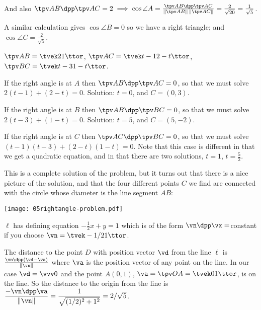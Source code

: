 And also $\tpv AB\dpp \tpv AC = 2 \implies \cos \angle A =
\frac{\tpv AB\dpp \tpv AC}{\|\tpv AB\|\,\|\tpv AC\|} =
\frac{2}{\sqrt{20}} = \frac{1}{\sqrt{5}}$.

A similar calculation gives $\cos \angle B = 0$ so we have a right triangle;
and $\cos\angle C = \frac{2}{\sqrt{5}}$.
\bigskip

\item[{\bfseries(VI12.4)}]

$\tpv AB = \tvek2\\1\ttor$,
$\tpv AC = \tvek t-1\\ 2-t\ttor$,
$\tpv BC = \tvek t-3 \\1-t\ttor$.

If the right angle is at $A$ then $\tpv AB \dpp \tpv AC = 0$, so that
we must solve $2(t-1) + (2-t) = 0$. Solution: $t=0$, and $C = (0,3)$.

If the right angle is at $B$ then $\tpv AB \dpp \tpv BC = 0$, so that
we must solve $2(t-3) + (1-t) = 0$. Solution: $t=5$, and $C = (5, -2)$.

If the right angle is at $C$ then $\tpv AC \dpp \tpv BC = 0$, so that
we must solve $(t-1)(t-3) + (2-t)(1-t) = 0$. Note that this case is
different in that we get a quadratic equation, and in that there are two
solutions, $t=1$, $t=\frac52$.

This is a complete solution of the problem, but it turns out that there is a
nice picture of the solution, and that the four different points $C$ we find
are connected with the circle whose diameter is the line segment $AB$:
\begin{center}
  \texttt{[image: 05rightangle-problem.pdf]}
\end{center}
\bigskip

\item[{\bfseries(VI12.5a)}]

$\ell$ has defining equation $-\frac12 x + y = 1$ which is of the form
$\vn\dpp\vx = $constant if you choose $\vn = \tvek-1/2 \\ 1\ttor$.
\bigskip

\item[{\bfseries(VI12.5b)}]

The distance to the point $D$ with position vector $\vd$ from the line
$\ell$ is $\frac{\vn\dpp(\vd-\va)}{\|\vn\|}$ where $\va$ is the position
vector of any point on the line.  In our case $\vd = \vvv0$
and the point $A(0,1)$, $\va = \tpv OA = \tvek 0\\1\ttor$, is on the line.
So the distance to the origin from the line is $\dfrac{-\vn\dpp\va}{\|\vn\|}
= \dfrac{1}{\sqrt{(1/2)^2 + 1^2}} = 2/\sqrt{5}$.
\bigskip

